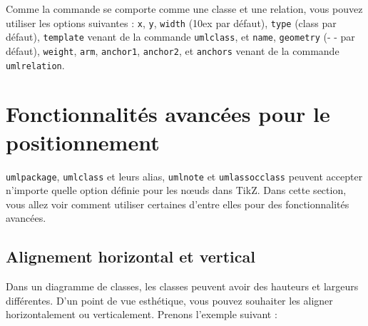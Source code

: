 \documentclass[a4paper,11pt]{report}
\newcommand{\inputTikZ}[1]{%
  }%
\newcommand{\inputTikZ}[1]{%
    \texttt{[image: fig/\#1.pdf]}%
  }%
\newcommand{\TikZ}{{\sc TikZ}}
\begin{document}
\medskip

\begin{minipage}{0.4\textwidth}

\end{minipage}
\begin{minipage}{0.6\textwidth}
\begin{center}
\inputTikZ{assocclass}
\end{center}
\end{minipage}

\medskip

Comme la commande se comporte comme une classe et une relation, vous pouvez utiliser les options suivantes : {\tt x}, {\tt y}, {\tt width} (10ex par défaut), {\tt type} (class par défaut), {\tt template} venant de la commande {\tt umlclass}, et {\tt name}, {\tt geometry} (- - par défaut), {\tt weight}, {\tt arm}, {\tt anchor1}, {\tt anchor2}, et {\tt anchors} venant de la commande {\tt umlrelation}.

\section{Fonctionnalités avancées pour le positionnement}\label{s.advfeat}

{\tt umlpackage}, {\tt umlclass} et leurs alias, {\tt umlnote} et {\tt umlassocclass} peuvent accepter n'importe quelle option définie pour les n\oe{}uds dans \TikZ.
Dans cette section, vous allez voir comment utiliser certaines d'entre elles pour des fonctionnalités avancées.

\subsection{Alignement horizontal et vertical}\label{ss.hvalign}

Dans un diagramme de classes, les classes peuvent avoir des hauteurs et largeurs différentes. D'un point de vue esthétique, vous pouvez souhaiter les aligner horizontalement ou verticalement. Prenons l'exemple suivant :

\medskip

\begin{minipage}{0.5\textwidth}

\end{minipage}
\begin{minipage}{0.5\textwidth}
\begin{center}
\inputTikZ{valign}
\end{center}
\end{minipage}
\end{document}

